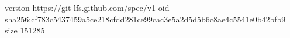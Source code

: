 version https://git-lfs.github.com/spec/v1
oid sha256:cf783c5437459a5ce218cfdd281ce99cac3e5a2d5d5b6c8ae4c5541e0b42bfb9
size 151285
